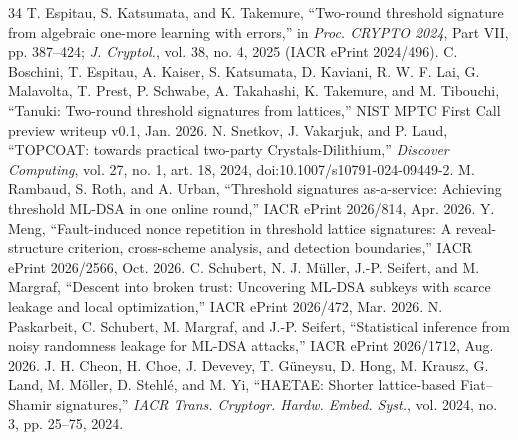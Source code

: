 \documentclass[10pt,conference,a4paper]{IEEEtran}
\begin{document}
\begin{thebibliography}{34}
 T. Espitau, S. Katsumata, and K. Takemure, ``Two-round threshold signature from algebraic one-more learning with errors,'' in \emph{Proc. CRYPTO 2024}, Part VII, pp. 387--424; \emph{J. Cryptol.}, vol. 38, no. 4, 2025 (IACR ePrint 2024/496).
 C. Boschini, T. Espitau, A. Kaiser, S. Katsumata, D. Kaviani, R. W. F. Lai, G. Malavolta, T. Prest, P. Schwabe, A. Takahashi, K. Takemure, and M. Tibouchi, ``Tanuki: Two-round threshold signatures from lattices,'' NIST MPTC First Call preview writeup v0.1, Jan. 2026.
 N. Snetkov, J. Vakarjuk, and P. Laud, ``TOPCOAT: towards practical two-party Crystals-Dilithium,'' \emph{Discover Computing}, vol. 27, no. 1, art. 18, 2024, doi:10.1007/s10791-024-09449-2.
 M. Rambaud, S. Roth, and A. Urban, ``Threshold signatures as-a-service: Achieving threshold ML-DSA in one online round,'' IACR ePrint 2026/814, Apr. 2026.
 Y. Meng, ``Fault-induced nonce repetition in threshold lattice signatures: A reveal-structure criterion, cross-scheme analysis, and detection boundaries,'' IACR ePrint 2026/2566, Oct. 2026.
 C. Schubert, N. J. M\"uller, J.-P. Seifert, and M. Margraf, ``Descent into broken trust: Uncovering ML-DSA subkeys with scarce leakage and local optimization,'' IACR ePrint 2026/472, Mar. 2026.
 N. Paskarbeit, C. Schubert, M. Margraf, and J.-P. Seifert, ``Statistical inference from noisy randomness leakage for ML-DSA attacks,'' IACR ePrint 2026/1712, Aug. 2026.
 J. H. Cheon, H. Choe, J. Devevey, T. G\"uneysu, D. Hong, M. Krausz, G. Land, M. M\"oller, D. Stehl\'e, and M. Yi, ``HAETAE: Shorter lattice-based Fiat--Shamir signatures,'' \emph{IACR Trans. Cryptogr. Hardw. Embed. Syst.}, vol. 2024, no. 3, pp. 25--75, 2024.
\end{thebibliography}
\end{document}
